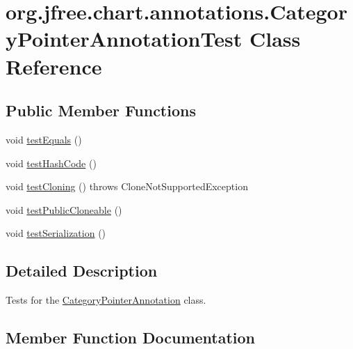 \hypertarget{classorg_1_1jfree_1_1chart_1_1annotations_1_1_category_pointer_annotation_test}{}\section{org.\+jfree.\+chart.\+annotations.\+Category\+Pointer\+Annotation\+Test Class Reference}
\label{classorg_1_1jfree_1_1chart_1_1annotations_1_1_category_pointer_annotation_test}
\subsection*{Public Member Functions}
\begin{DoxyCompactItemize}
\item 
void \mbox{\hyperlink{classorg_1_1jfree_1_1chart_1_1annotations_1_1_category_pointer_annotation_test_a0d5484d776a0a1fa15321a48d73203e6}{test\+Equals}} ()
\item 
void \mbox{\hyperlink{classorg_1_1jfree_1_1chart_1_1annotations_1_1_category_pointer_annotation_test_aa140a50b534e123f157c2dd43e659377}{test\+Hash\+Code}} ()
\item 
void \mbox{\hyperlink{classorg_1_1jfree_1_1chart_1_1annotations_1_1_category_pointer_annotation_test_a2b6d43fb71ba35f063e7ca20e5b09157}{test\+Cloning}} ()  throws Clone\+Not\+Supported\+Exception 
\item 
void \mbox{\hyperlink{classorg_1_1jfree_1_1chart_1_1annotations_1_1_category_pointer_annotation_test_af3571686712daebfb022b36b898498cf}{test\+Public\+Cloneable}} ()
\item 
void \mbox{\hyperlink{classorg_1_1jfree_1_1chart_1_1annotations_1_1_category_pointer_annotation_test_ac9cebc5205858f5fac7a6591e618c1f8}{test\+Serialization}} ()
\end{DoxyCompactItemize}


\subsection{Detailed Description}
Tests for the \mbox{\hyperlink{classorg_1_1jfree_1_1chart_1_1annotations_1_1_category_pointer_annotation}{Category\+Pointer\+Annotation}} class. 

\subsection{Member Function Documentation}
\mbox{\label{classorg_1_1jfree_1_1chart_1_1annotations_1_1_category_pointer_annotation_test_a2b6d43fb71ba35f063e7ca20e5b09157}} 
